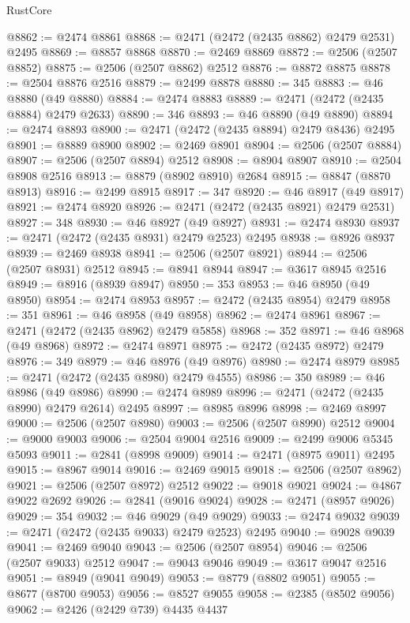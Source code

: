 \begin{lexlean}{RustCore}
\begin{coremodule}
@8862 := @2474 @8861
@8868 := @2471 (@2472 (@2435 @8862) @2479 @2531) @2495
@8869 := @8857 @8868
@8870 := @2469 @8869
@8872 := @2506 (@2507 @8852)
@8875 := @2506 (@2507 @8862) @2512
@8876 := @8872 @8875
@8878 := @2504 @8876 @2516
@8879 := @2499 @8878
@8880 := 345
@8883 := @46 @8880 (@49 @8880)
@8884 := @2474 @8883
@8889 := @2471 (@2472 (@2435 @8884) @2479 @2633)
@8890 := 346
@8893 := @46 @8890 (@49 @8890)
@8894 := @2474 @8893
@8900 := @2471 (@2472 (@2435 @8894) @2479 @8436) @2495
@8901 := @8889 @8900
@8902 := @2469 @8901
@8904 := @2506 (@2507 @8884)
@8907 := @2506 (@2507 @8894) @2512
@8908 := @8904 @8907
@8910 := @2504 @8908 @2516
@8913 := @8879 (@8902 @8910) @2684
@8915 := @8847 (@8870 @8913)
@8916 := @2499 @8915
@8917 := 347
@8920 := @46 @8917 (@49 @8917)
@8921 := @2474 @8920
@8926 := @2471 (@2472 (@2435 @8921) @2479 @2531)
@8927 := 348
@8930 := @46 @8927 (@49 @8927)
@8931 := @2474 @8930
@8937 := @2471 (@2472 (@2435 @8931) @2479 @2523) @2495
@8938 := @8926 @8937
@8939 := @2469 @8938
@8941 := @2506 (@2507 @8921)
@8944 := @2506 (@2507 @8931) @2512
@8945 := @8941 @8944
@8947 := @3617 @8945 @2516
@8949 := @8916 (@8939 @8947)
@8950 := 353
@8953 := @46 @8950 (@49 @8950)
@8954 := @2474 @8953
@8957 := @2472 (@2435 @8954) @2479
@8958 := 351
@8961 := @46 @8958 (@49 @8958)
@8962 := @2474 @8961
@8967 := @2471 (@2472 (@2435 @8962) @2479 @5858)
@8968 := 352
@8971 := @46 @8968 (@49 @8968)
@8972 := @2474 @8971
@8975 := @2472 (@2435 @8972) @2479
@8976 := 349
@8979 := @46 @8976 (@49 @8976)
@8980 := @2474 @8979
@8985 := @2471 (@2472 (@2435 @8980) @2479 @4555)
@8986 := 350
@8989 := @46 @8986 (@49 @8986)
@8990 := @2474 @8989
@8996 := @2471 (@2472 (@2435 @8990) @2479 @2614) @2495
@8997 := @8985 @8996
@8998 := @2469 @8997
@9000 := @2506 (@2507 @8980)
@9003 := @2506 (@2507 @8990) @2512
@9004 := @9000 @9003
@9006 := @2504 @9004 @2516
@9009 := @2499 @9006 @5345 @5093
@9011 := @2841 (@8998 @9009)
@9014 := @2471 (@8975 @9011) @2495
@9015 := @8967 @9014
@9016 := @2469 @9015
@9018 := @2506 (@2507 @8962)
@9021 := @2506 (@2507 @8972) @2512
@9022 := @9018 @9021
@9024 := @4867 @9022 @2692
@9026 := @2841 (@9016 @9024)
@9028 := @2471 (@8957 @9026)
@9029 := 354
@9032 := @46 @9029 (@49 @9029)
@9033 := @2474 @9032
@9039 := @2471 (@2472 (@2435 @9033) @2479 @2523) @2495
@9040 := @9028 @9039
@9041 := @2469 @9040
@9043 := @2506 (@2507 @8954)
@9046 := @2506 (@2507 @9033) @2512
@9047 := @9043 @9046
@9049 := @3617 @9047 @2516
@9051 := @8949 (@9041 @9049)
@9053 := @8779 (@8802 @9051)
@9055 := @8677 (@8700 @9053)
@9056 := @8527 @9055
@9058 := @2385 (@8502 @9056)
@9062 := @2426 (@2429 @739) @4435 @4437

\end{coremodule}
\end{lexlean}

